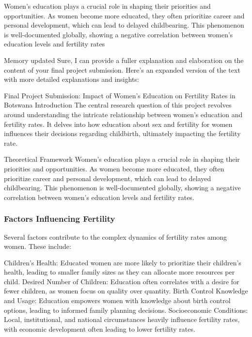 \documentclass[
  letterpaper,
  DIV=11,
  numbers=noendperiod]{scrartcl}
\begin{document}
Women's education plays a crucial role in shaping their priorities and
opportunities. As women become more educated, they often prioritize
career and personal development, which can lead to delayed childbearing.
This phenomenon is well-documented globally, showing a negative
correlation between women's education levels and fertility rates

Memory updated Sure, I can provide a fuller explanation and elaboration
on the content of your final project submission. Here's an expanded
version of the text with more detailed explanations and insights:

Final Project Submission: Impact of Women's Education on Fertility Rates
in Botswana Introduction The central research question of this project
revolves around understanding the intricate relationship between women's
education and fertility rates. It delves into how education about sex
and fertility for women influences their decisions regarding childbirth,
ultimately impacting the fertility rate.

Theoretical Framework Women's education plays a crucial role in shaping
their priorities and opportunities. As women become more educated, they
often prioritize career and personal development, which can lead to
delayed childbearing. This phenomenon is well-documented globally,
showing a negative correlation between women's education levels and
fertility rates.

\hypertarget{factors-influencing-fertility}{%
\subsubsection{Factors Influencing
Fertility}\label{factors-influencing-fertility}}

Several factors contribute to the complex dynamics of fertility rates
among women. These include:

Children's Health: Educated women are more likely to prioritize their
children's health, leading to smaller family sizes as they can allocate
more resources per child. Desired Number of Children: Education often
correlates with a desire for fewer children, as women focus on quality
over quantity. Birth Control Knowledge and Usage: Education empowers
women with knowledge about birth control options, leading to informed
family planning decisions. Socioeconomic Conditions: Local,
institutional, and national circumstances heavily influence fertility
rates, with economic development often leading to lower fertility rates.
\end{document}
